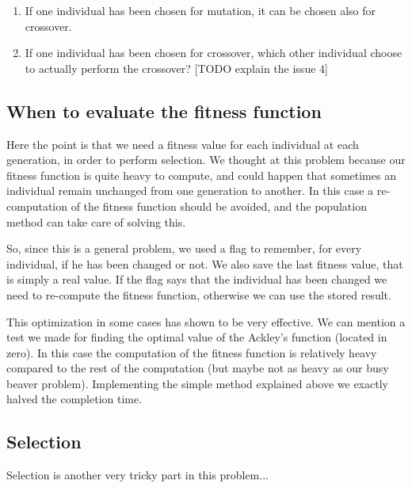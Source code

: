 \documentclass{report}
\begin{document}
\begin{enumerate}
\item If one individual has been chosen for mutation, it can be chosen also for crossover.
\item If one individual has been chosen for crossover, which other individual choose to actually perform the crossover? [TODO explain the issue 4]
\end{enumerate}

\subsection{When to evaluate the fitness function}

Here the point is that we need a fitness value for each individual at each generation, in order to perform selection.
We thought at this problem because our fitness function is quite heavy to compute, and could happen that sometimes an individual remain unchanged from one generation to another. In this case a re-computation of the fitness function should be avoided, and the population method can take care of solving this.

So, since this is a general problem, we used a flag to remember, for every individual, if he has been changed or not. We also save the last fitness value, that is simply a real value. If the flag says that the individual has been changed we need to re-compute the fitness function, otherwise we can use the stored result.

This optimization in some cases has shown to be very effective. We can mention a test we made for finding the optimal value of the Ackley's function (located in zero). In this case the computation of the fitness function is relatively heavy compared to the rest of the computation (but maybe not as heavy as our busy beaver problem).
Implementing the simple method explained above we exactly halved the completion time.

\subsection{Selection}

Selection is another very tricky part in this problem...
\end{document}
